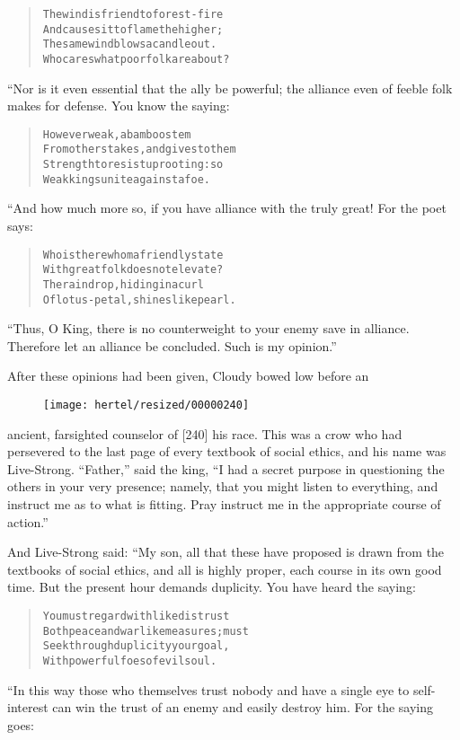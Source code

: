 \documentclass[article, twoside, 10pt]{memoir}
\renewenvironment{verbatim}{%
\begin{quote}%
\vskip -10pt%
\begin{alltt}\normalfont\small}{\end{alltt}%
\end{quote}%
\vskip -10pt
} %
\begin{document}
\begin{verbatim}
The wind is friend to forest-fire
And causes it to flame the higher;
The same wind blows a candle out.
Who cares what poor folk are about?
\end{verbatim}
“Nor is it even essential that the ally be powerful; the alliance
even of feeble folk makes for defense. You know the saying:

\begin{verbatim}
However weak, a bamboo stem
From others takes, and gives to them
Strength to resist uprooting: so
Weak kings unite against a foe.
\end{verbatim}
“And how much more so, if you have alliance with the truly great!
For the poet says:

\begin{verbatim}
Who is there whom a friendly state
With great folk does not elevate?
The raindrop, hiding in a curl
Of lotus-petal, shines like pearl.
\end{verbatim}
``Thus, O King, there is no counterweight to your enemy save in alliance. Therefore let an alliance be concluded. Such is my opinion.''

After these opinions had been given, Cloudy bowed low before an
\begin{figure}[p]\texttt{[image: hertel/resized/00000240]}\end{figure}ancient, farsighted counselor of [240] his race. This was a crow
who had persevered to the last page of every textbook of social
ethics, and his name was Live-Strong. ``Father,'' said the king,
``I had a secret purpose in questioning the others in your very presence; namely, that you might listen to everything, and instruct me as to what is fitting. Pray instruct me in the appropriate course of action.''

And Live-Strong said: “My son, all that these have proposed is
drawn from the textbooks of social ethics, and all is highly
proper, each course in its own good time. But the present hour
demands duplicity. You have heard the saying:

\begin{verbatim}
You must regard with like distrust
Both peace and warlike measures; must
Seek through duplicity your goal,
With powerful foes of evil soul.
\end{verbatim}
“In this way those who themselves trust nobody and have a single
eye to self-interest can win the trust of an enemy and easily
destroy him. For the saying goes:
\end{document}
